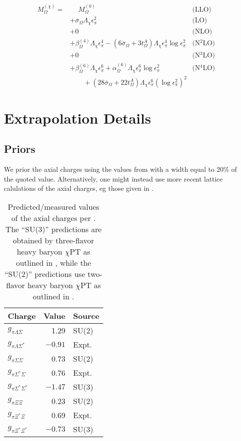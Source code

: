 \documentclass[12pt,tightenlines, raggedbottom, prd, notitlepage]{revtex4-1}
\begin{document}
\begin{align*}
M_{\Omega}^{(\chi)} = &\phantom{+} M_\Omega^{(0)} &\text{(LLO)} \\
&+ \overline{\sigma}_\Omega \Lambda_\chi \epsilon_\pi^2 & \text{(LO)} \\
&+ 0 & \text{(NLO)} \\
&+ \beta_\Omega^{(4)} \Lambda_\chi \epsilon_\pi^4 
-\left(6 \overline{\sigma}_\Omega + 3 t_\Omega^A \right)\Lambda_\chi \epsilon_\pi^4 \log \epsilon_\pi^2
& \text{(N$^2$LO)} \\
&+ 0 & \text{(N$^3$LO)} \\
&+ \beta_\Omega^{(6)} \Lambda_\chi \epsilon_\pi^6 
+ \alpha_\Omega^{(6)} \Lambda_\chi \epsilon_\pi^6  \log \epsilon_\pi^2
& \text{(N$^4$LO)} \\
&\qquad + \left(28 \overline{\sigma}_\Omega + 22 t_\Omega^A  \right)\Lambda_\chi \epsilon_\pi^6  \left(\log \epsilon_\pi^2 \right)^2
\end{align*}

\section{Extrapolation Details}

\subsection{Priors}
We prior the axial charges using the values from \cite{Jiang:2009sf} with a width equal to $20\%$ of the quoted value. Alternatively, one might instead use more recent lattice calulations of the axial charges, eg those given in \cite{Alexandrou:2016xok}.

\begin{table}[]
    \begin{tabular}{lr|l}
    Charge                    & Value   & Source\\ \hline
    $g_{\pi\Lambda\Sigma}$    & 1.29    & SU(2)\\
    $g_{\pi\Lambda\Sigma^*}$  & $-0.91$ & Expt. \\
    $g_{\pi\Sigma\Sigma}$     & 0.73    & SU(2)\\
    $g_{\pi\Sigma^*\Sigma}$   & 0.76    & Expt. \\
    $g_{\pi\Sigma^*\Sigma^*}$ & $-1.47$ & SU(3)\\ \hline
    $g_{\pi\Xi\Xi}$           & 0.23    & SU(2)\\
    $g_{\pi\Xi^*\Xi}$         & 0.69    & Expt. \\
    $g_{\pi\Xi^*\Xi^*}$       & $-0.73$ & SU(3)     
    \end{tabular}
    \caption{Predicted/measured values of the axial charges per \cite{Jiang:2009sf}. The ``SU(3)'' predictions are obtained by three-flavor heavy baryon $\chi$PT as outlined in \cite{Butler:1992pn}, while the ``SU(2)'' predictions use two-flavor heavy baryon $\chi$PT as outlined in \cite{Jiang:2009sf}. }
\end{table}
\end{document}
